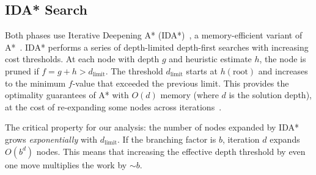 \documentclass[conference]{IEEEtran}
\begin{document}
\subsection{IDA* Search}
\label{sec:ida-star}
Both phases use Iterative Deepening A* (IDA*)~\cite{korf1985}, a memory-efficient variant of A*~\cite{hart1968}. IDA* performs a series of depth-limited depth-first searches with increasing cost thresholds. At each node with depth $g$ and heuristic estimate $h$, the node is pruned if $f = g + h > d_{\text{limit}}$. The threshold $d_{\text{limit}}$ starts at $h(\text{root})$ and increases to the minimum $f$-value that exceeded the previous limit. This provides the optimality guarantees of A* with $O(d)$ memory (where $d$ is the solution depth), at the cost of re-expanding some nodes across iterations~\cite{pearl1984}.

The critical property for our analysis: the number of nodes expanded by IDA* grows \emph{exponentially} with $d_{\text{limit}}$. If the branching factor is $b$, iteration $d$ expands $O(b^d)$ nodes. This means that increasing the effective depth threshold by even one move multiplies the work by $\sim b$.
\end{document}
